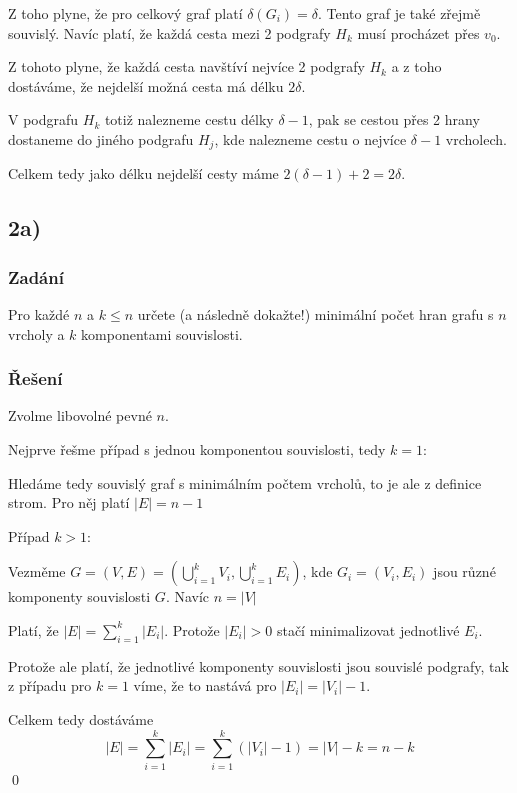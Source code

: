 \documentclass[../main.tex]{subfiles}
\begin{document}
Z toho plyne, že pro celkový graf platí $\delta(G_i) = \delta$. Tento graf je také zřejmě souvislý. 
Navíc platí, že každá cesta mezi 2 podgrafy $H_k$ musí procházet přes $v_0$.

Z tohoto plyne, že každá cesta navštíví nejvíce 2 podgrafy $H_k$ a 
z toho dostáváme, že nejdelší možná cesta má délku $2\delta$.

V podgrafu $H_k$ totiž nalezneme cestu délky $\delta -1$, pak se cestou přes 2 hrany dostaneme do jiného podgrafu $H_j$, kde nalezneme cestu o nejvíce $\delta-1$ vrcholech.

Celkem tedy jako délku nejdelší cesty máme $2( \delta - 1) + 2 = 2\delta$. 



\subsection{2a)}
\subsubsection*{Zadání}
Pro každé $n$ a $k\leq n$ určete (a následně dokažte!) minimální počet hran grafu
s $n$ vrcholy a $k$ komponentami souvislosti.

\subsubsection*{Řešení}

Zvolme libovolné pevné $n$. 

Nejprve řešme případ s jednou komponentou souvislosti, tedy $k=1$:

Hledáme tedy souvislý graf s minimálním počtem vrcholů, to je ale z definice strom. Pro něj platí $|E| = n-1$

Případ $k>1$: 

Vezměme $G= (V,E) =( \bigcup_{i=1}^k V_i  ,\bigcup_{i=1}^k E_i )$, kde $G_i = (V_i, E_i)$ jsou různé komponenty souvislosti $G$. Navíc $n= |V|$

Platí, že $|E| = \sum_{i=1}^k|E_i|$. Protože $|E_i|>0$ stačí minimalizovat jednotlivé $E_i$.

Protože ale platí, že jednotlivé komponenty souvislosti jsou souvislé podgrafy, tak z případu pro $k=1$ víme, že to nastává pro $|E_i| = |V_i| -1$.

Celkem tedy dostáváme 
\begin{equation*}
    |E| = \sum_{i=1}^k|E_i| = \sum_{i=1}^k(|V_i| - 1) = |V| - k = n-k
\end{equation*}
\qed 
\end{document}
